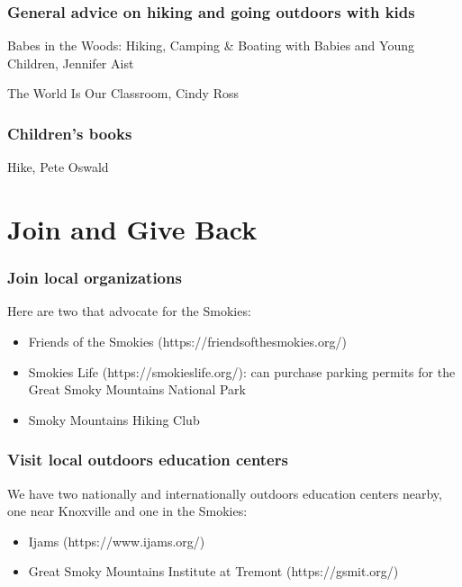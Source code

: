 \documentclass[
  letterpaper,
  DIV=11,
  numbers=noendperiod]{scrreprt}
\providecommand{\tightlist}{%
  \setlength{\itemsep}{0pt}\setlength{\parskip}{0pt}}\usepackage{longtable,booktabs,array}
\begin{document}
\subsection{General advice on hiking and going outdoors with
kids}\label{general-advice-on-hiking-and-going-outdoors-with-kids}

Babes in the Woods: Hiking, Camping \& Boating with Babies and Young
Children, Jennifer Aist

The World Is Our Classroom, Cindy Ross

\subsection{Children's books}\label{childrens-books}

Hike, Pete Oswald

\chapter{Join and Give Back}\label{join-and-give-back}

\subsection{Join local organizations}\label{join-local-organizations}

Here are two that advocate for the Smokies:

\begin{itemize}
\tightlist
\item
  Friends of the Smokies (https://friendsofthesmokies.org/)
\item
  Smokies Life (https://smokieslife.org/): can purchase parking permits
  for the Great Smoky Mountains National Park
\item
  Smoky Mountains Hiking Club
\end{itemize}

\subsection{Visit local outdoors education
centers}\label{visit-local-outdoors-education-centers}

We have two nationally and internationally outdoors education centers
nearby, one near Knoxville and one in the Smokies:

\begin{itemize}
\tightlist
\item
  Ijams (https://www.ijams.org/)
\item
  Great Smoky Mountains Institute at Tremont (https://gsmit.org/)
\end{itemize}
\end{document}
